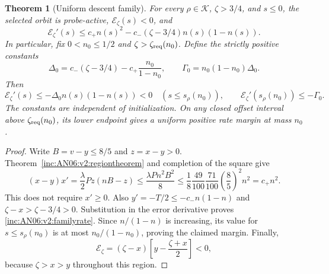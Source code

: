 \documentclass[11pt]{article}
\numberwithin{equation}{section}
\newtheorem{theorem}{Theorem}[section]
\theoremstyle{remark}\newtheorem{remark}[theorem]{Remark}
\newcommand{\1}{\mathbf 1}
\begin{document}
\begin{theorem}[Uniform descent family]
\label{inc:AN06:v2:familytheorem}
For every $\rho\in\mathcal K$, $\zeta>3/4$, and $s\le0$, the selected
orbit is probe-active, $\mathcal E_\zeta(s)<0$, and
\begin{equation}\label{inc:AN06:v2:familyrate}
 \mathcal E_\zeta'(s)
 \le c_+n(s)^2-c_-(\zeta-3/4)n(s)(1-n(s)).
\end{equation}
In particular, fix $0<n_0\le1/2$ and $\zeta>\zeta_{\rm req}(n_0)$.
Define the strictly positive constants
\begin{equation}\label{inc:AN06:v2:familymargin}
 \Delta_0=c_-(\zeta-3/4)-c_+\frac{n_0}{1-n_0},\qquad
 \Gamma_0=n_0(1-n_0)\Delta_0.
\end{equation}
Then
\[
 \mathcal E_\zeta'(s)\le-\Delta_0 n(s)(1-n(s))<0
 \quad(s\le s_\rho(n_0)),\qquad
 \mathcal E_\zeta'(s_\rho(n_0))\le-\Gamma_0.
\]
The constants are independent of initialization. On any closed offset
interval above $\zeta_{\rm req}(n_0)$, its lower endpoint gives a uniform
positive rate margin at mass $n_0$.
\end{theorem}
\begin{proof}
Write $B=v-y\le8/5$ and $z=x-y>0$.
Theorem~\ref{inc:AN06:v2:regiontheorem} and completion of the square give
\[
 (x-y)x'=\frac\lambda2Pz(nB-z)
 \le\frac{\lambda Pn^2B^2}{8}
 \le\frac18\frac{49}{100}\frac{71}{100}
                 \left(\frac85\right)^2n^2=c_+n^2.
\]
This does not require $x'\ge0$. Also
$y'=-T/2\le-c_-n(1-n)$ and $\zeta-x>\zeta-3/4>0$.
Substitution in the error derivative proves
\eqref{inc:AN06:v2:familyrate}.
Since $n/(1-n)$ is increasing, its value for $s\le s_\rho(n_0)$ is at
most $n_0/(1-n_0)$, proving the claimed margin.
Finally,
\[
 \mathcal E_\zeta=(\zeta-x)\left[y-\frac{\zeta+x}{2}\right]<0,
\]
because $\zeta>x>y$ throughout this region.
\end{proof}
\end{document}
